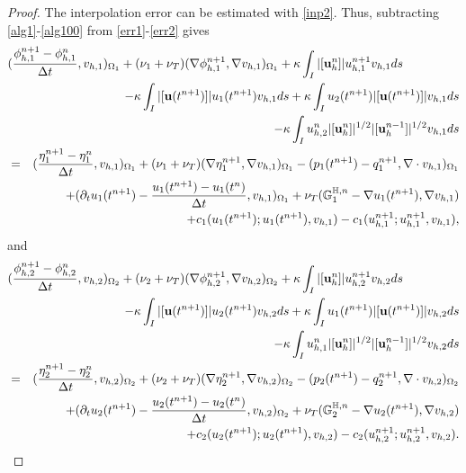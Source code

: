 \documentclass[10pt]{article}%
\numberwithin{equation}{section}
\begin{document}
\begin{proof}
The interpolation error can be estimated with \eqref{inp2}. Thus, subtracting \eqref{alg1}-\eqref{alg100} from \eqref{err1}-\eqref{err2} gives
	\begin{eqnarray}
	\lefteqn{(\frac{\phi_{h,1}^{n+1}-\phi_{h,1}^{n}}{\Delta t} ,v_{h,1})_{\Omega_1} +(\nu_1+\nu_T)(\nabla  \phi_{h,1}^{n+1},\nabla v_{h,1})_{\Omega_1}+\kappa \int_{I}|[{\bf u}_h^n]|u_{h,1}^{n+1}v_{h,1}ds}
		\nonumber\\
		&&-\kappa \int_{I}|[{\bf u}(t^{n+1})]|u_1(t^{n+1})v_{h,1}ds+\kappa \int_{I}u_{2}(t^{n+1})|[{\bf u}(t^{n+1})]|v_{h,1}ds\nonumber
		\\&&-\kappa \int_{I}u_{h,2}^n|[{\bf u}_h^n]|^{1/2}|[{\bf u}_h^{n-1}]|^{1/2}v_{h,1}ds
	\nonumber\\&=&(\frac{\eta_{1}^{n+1}-\eta_{1}^{n}}{\Delta t} ,v_{h,1})_{\Omega_1}+(\nu_1+\nu_T)(\nabla  \eta_{1}^{n+1},\nabla v_{h,1})_{\Omega_1}-(p_1(t^{n+1})-q_1^{n+1},\nabla\cdot v_{h,1})_{\Omega_1}\nonumber\\&&+(\partial_{t}u_1(t^{n+1})-\frac{{u_1(t^{n+1})}-u_{1}(t^{n})}{\Delta t} ,v_{h,1})_{\Omega_1}+\nu_T(\mathbb{G}_1^{\mathbb{H},n}-\nabla u_1(t^{n+1}),\nabla v_{h,1})\nonumber\\&&+{c_1(u_{1}(t^{n+1});u_{1}(t^{n+1}),v_{h,1})}-{c_1(u_{h,1}^{n+1};u_{h,1}^{n+1},v_{h,1})}, \label{err3}
	\end{eqnarray}
	and
	\begin{eqnarray}
	\lefteqn{(\frac{\phi_{h,2}^{n+1}-\phi_{h,2}^{n}}{\Delta t} ,v_{h,2})_{\Omega_2} +(\nu_2+\nu_T)(\nabla  \phi_{h,2}^{n+1},\nabla v_{h,2})_{\Omega_2}+\kappa \int_{I}|[{\bf u}_h^n]|u_{h,2}^{n+1}v_{h,2}ds}
		\nonumber\\
		&&-\kappa \int_{I}|[{\bf u}(t^{n+1})]|u_{2}(t^{n+1})v_{h,2}ds+\kappa \int_{I}u_1(t^{n+1})|[{\bf u}(t^{n+1})]|v_{h,2}ds\nonumber\\&&-\kappa \int_{I}u_{h,1}^n|[{\bf u}_h^n]|^{1/2}|[{\bf u}_h^{n-1}]|^{1/2}v_{h,2}ds\nonumber
	\nonumber\\&=&(\frac{\eta_{2}^{n+1}-\eta_{2}^{n}}{\Delta t} ,v_{h,2})_{\Omega_2}+(\nu_2+\nu_T)(\nabla  \eta_{2}^{n+1},\nabla v_{h,2})_{\Omega_2}-(p_2(t^{n+1})-q_2^{n+1},\nabla\cdot v_{h,2})_{\Omega_2}\nonumber\\&&+(\partial_{t}u_2(t^{n+1})-\frac{{u_{2}(t^{n+1})}-u_{2}(t^{n})}{\Delta t} ,v_{h,2})_{\Omega_2}+\nu_T(\mathbb{G}_2^{\mathbb{H},n}-\nabla u_{2}(t^{n+1}),\nabla v_{h,2})\nonumber\\&&+{c_2(u_{2}(t^{n+1});u_{2}(t^{n+1}),v_{h,2})}-{c_2(u_{h,2}^{n+1};u_{h,2}^{n+1},v_{h,2})}. \label{err4}
	\end{eqnarray}

\end{proof}
\end{document}

